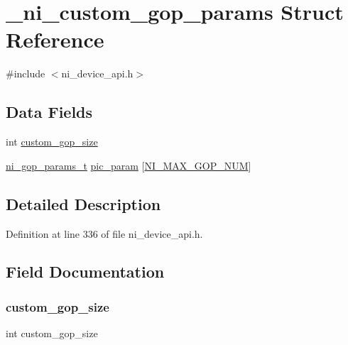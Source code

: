 \hypertarget{struct__ni__custom__gop__params}{}\section{\+\_\+ni\+\_\+custom\+\_\+gop\+\_\+params Struct Reference}
\label{struct__ni__custom__gop__params}


{\ttfamily \#include $<$ni\+\_\+device\+\_\+api.\+h$>$}

\subsection*{Data Fields}
\begin{DoxyCompactItemize}
\item 
int \mbox{\hyperlink{struct__ni__custom__gop__params_a6c01254e2506defe6a9627dee4d275c2}{custom\+\_\+gop\+\_\+size}}
\item 
\mbox{\hyperlink{ni__device__api_8h_a8f3d4340799582c792883fd92878bf9b}{ni\+\_\+gop\+\_\+params\+\_\+t}} \mbox{\hyperlink{struct__ni__custom__gop__params_a97c57dd3d3aade411b670c4fee49612d}{pic\+\_\+param}} \mbox{[}\mbox{\hyperlink{ni__device__api_8h_a4fdb37034e4182c47a5c5e46a1385ff0}{N\+I\+\_\+\+M\+A\+X\+\_\+\+G\+O\+P\+\_\+\+N\+UM}}\mbox{]}
\end{DoxyCompactItemize}


\subsection{Detailed Description}


Definition at line 336 of file ni\+\_\+device\+\_\+api.\+h.



\subsection{Field Documentation}
\mbox{\label{struct__ni__custom__gop__params_a6c01254e2506defe6a9627dee4d275c2}} 
\subsubsection{\texorpdfstring{custom\_gop\_size}{custom\_gop\_size}}
{\footnotesize\ttfamily int custom\+\_\+gop\+\_\+size}




